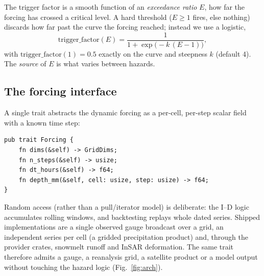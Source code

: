 \documentclass[authoryear,preprint,review,12pt]{elsarticle}
\begin{document}
The trigger factor is a smooth function of an \emph{exceedance ratio} $E$, how
far the forcing has crossed a critical level. A hard threshold ($E\geq 1$ fires,
else nothing) discards how far past the curve the forcing reached; instead we use
a logistic,
\begin{equation}
\mathrm{trigger\_factor}(E)=\frac{1}{1+\exp\!\big(-k\,(E-1)\big)},
\label{eq:logistic}
\end{equation}
with $\mathrm{trigger\_factor}(1)=0.5$ exactly on the curve and steepness $k$
(default 4). The \emph{source} of $E$ is what varies between hazards.

\subsection{The forcing interface}

A single trait abstracts the dynamic forcing as a per-cell, per-step scalar field
with a known time step:
\begin{verbatim}
pub trait Forcing {
    fn dims(&self) -> GridDims;
    fn n_steps(&self) -> usize;
    fn dt_hours(&self) -> f64;
    fn depth_mm(&self, cell: usize, step: usize) -> f64;
}
\end{verbatim}
Random access (rather than a pull/iterator model) is deliberate: the I--D logic
accumulates rolling windows, and backtesting replays whole dated series. Shipped
implementations are a single observed gauge broadcast over a grid, an independent
series per cell (a gridded precipitation product) and, through the provider
crates, snowmelt runoff and InSAR deformation. The same trait therefore admits a
gauge, a reanalysis grid, a satellite product or a model output without touching
the hazard logic (Fig.~\ref{fig:arch}).
\end{document}
